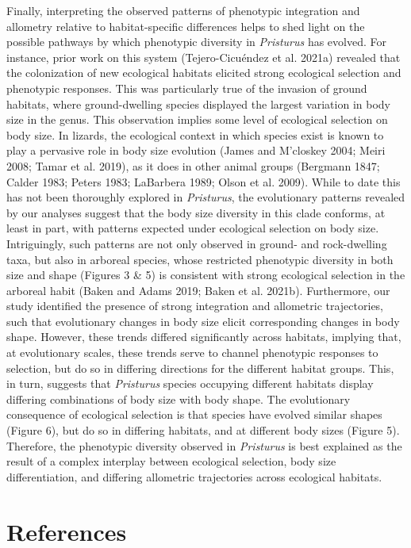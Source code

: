 \documentclass[
  11pt,
]{article}
\begin{document}
Finally, interpreting the observed patterns of phenotypic integration
and allometry relative to habitat-specific differences helps to shed
light on the possible pathways by which phenotypic diversity in
\emph{Pristurus} has evolved. For instance, prior work on this system
(Tejero-Cicuéndez et al. 2021a) revealed that the colonization of new
ecological habitats elicited strong ecological selection and phenotypic
responses. This was particularly true of the invasion of ground
habitats, where ground-dwelling species displayed the largest variation
in body size in the genus. This observation implies some level of
ecological selection on body size. In lizards, the ecological context in
which species exist is known to play a pervasive role in body size
evolution (James and M'closkey 2004; Meiri 2008; Tamar et al. 2019), as
it does in other animal groups (Bergmann 1847; Calder 1983; Peters 1983;
LaBarbera 1989; Olson et al. 2009). While to date this has not been
thoroughly explored in \emph{Pristurus}, the evolutionary patterns
revealed by our analyses suggest that the body size diversity in this
clade conforms, at least in part, with patterns expected under
ecological selection on body size. Intriguingly, such patterns are not
only observed in ground- and rock-dwelling taxa, but also in arboreal
species, whose restricted phenotypic diversity in both size and shape
(Figures 3 \& 5) is consistent with strong ecological selection in the
arboreal habit (Baken and Adams 2019; Baken et al. 2021b). Furthermore,
our study identified the presence of strong integration and allometric
trajectories, such that evolutionary changes in body size elicit
corresponding changes in body shape. However, these trends differed
significantly across habitats, implying that, at evolutionary scales,
these trends serve to channel phenotypic responses to selection, but do
so in differing directions for the different habitat groups. This, in
turn, suggests that \emph{Pristurus} species occupying different
habitats display differing combinations of body size with body shape.
The evolutionary consequence of ecological selection is that species
have evolved similar shapes (Figure 6), but do so in differing habitats,
and at different body sizes (Figure 5). Therefore, the phenotypic
diversity observed in \emph{Pristurus} is best explained as the result
of a complex interplay between ecological selection, body size
differentiation, and differing allometric trajectories across ecological
habitats.

\newpage

\hypertarget{references}{%
\section*{References}\label{references}}
\end{document}

